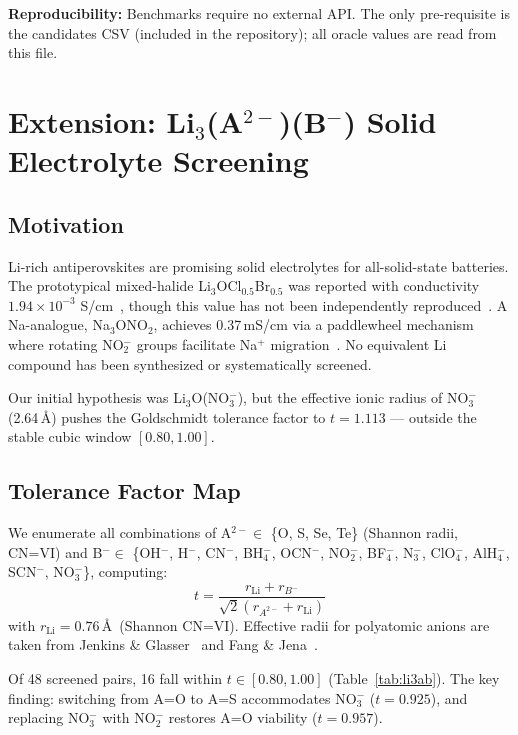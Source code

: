 \documentclass[10pt,twocolumn]{article}
\begin{document}
\textbf{Reproducibility:}
Benchmarks require no external API.
The only pre-requisite is the candidates CSV (included in the repository);
all oracle values are read from this file.

\section{Extension: Li$_3$(A$^{2-}$)(B$^-$) Solid Electrolyte Screening}

\subsection{Motivation}

Li-rich antiperovskites are promising solid electrolytes for all-solid-state
batteries.
The prototypical mixed-halide Li$_3$OCl$_{0.5}$Br$_{0.5}$ was reported with
conductivity $1.94\times10^{-3}$ S/cm~\cite{zhao2012}, though this value has
not been independently reproduced~\cite{xia2022}.
A Na-analogue, Na$_3$ONO$_2$, achieves 0.37\,mS/cm via a paddlewheel
mechanism where rotating NO$_2^-$ groups facilitate Na$^+$ migration~\cite{gao2020}.
No equivalent Li compound has been synthesized or systematically screened.

Our initial hypothesis was Li$_3$O(NO$_3^-$), but the effective ionic radius
of NO$_3^-$ (2.64\,\AA) pushes the Goldschmidt tolerance factor to
$t = 1.113$ --- outside the stable cubic window $[0.80, 1.00]$.

\subsection{Tolerance Factor Map}

We enumerate all combinations of A$^{2-} \in$ \{O, S, Se, Te\}
(Shannon radii, CN=VI) and B$^- \in$ \{OH$^-$, H$^-$, CN$^-$, BH$_4^-$,
OCN$^-$, NO$_2^-$, BF$_4^-$, N$_3^-$, ClO$_4^-$, AlH$_4^-$, SCN$^-$,
NO$_3^-$\}, computing:
\begin{equation}
  t = \frac{r_{\text{Li}} + r_{B^-}}{\sqrt{2}(r_{A^{2-}} + r_{\text{Li}})}
\end{equation}
with $r_{\text{Li}} = 0.76$\,\AA\ (Shannon CN=VI).
Effective radii for polyatomic anions are taken from Jenkins \& Glasser~\cite{jenkins2002}
and Fang \& Jena~\cite{fang2017}.

Of 48 screened pairs, 16 fall within $t \in [0.80, 1.00]$ (Table~\ref{tab:li3ab}).
The key finding: switching from A=O to A=S accommodates NO$_3^-$ ($t=0.925$),
and replacing NO$_3^-$ with NO$_2^-$ restores A=O viability ($t=0.957$).
\end{document}
